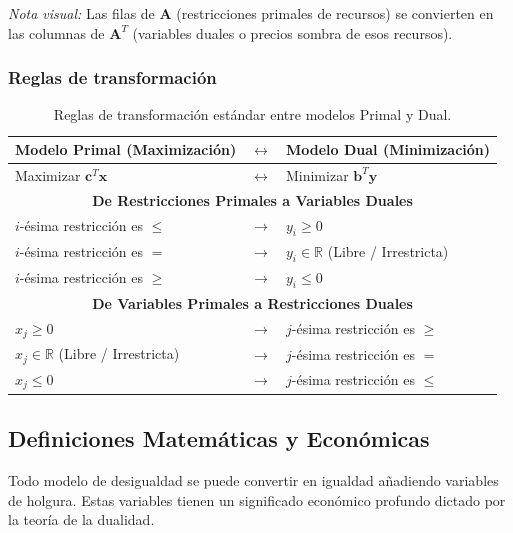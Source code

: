 \documentclass{article}
\begin{document}
	\vspace{0.5cm}
	\textit{Nota visual:} Las filas de $\mathbf{A}$ (restricciones primales de recursos) se convierten en las columnas de $\mathbf{A}^T$ (variables duales o precios sombra de esos recursos).
	
	\subsubsection{Reglas de transformación}
	\begin{table}[h]
		\centering
		\renewcommand{\arraystretch}{1.3}
		\begin{tabular}{|l|c|l|}
			\hline
			\textbf{Modelo Primal (Maximización)} & $\leftrightarrow$ & \textbf{Modelo Dual (Minimización)} \\ \hline
			Maximizar $\mathbf{c}^T \mathbf{x}$ & $\leftrightarrow$ & Minimizar $\mathbf{b}^T \mathbf{y}$ \\ \hline
			\multicolumn{3}{|c|}{\textbf{De Restricciones Primales a Variables Duales}} \\ \hline
			$i$-ésima restricción es $\leq$ & $\rightarrow$ & $y_i \geq 0$ \\ \hline
			$i$-ésima restricción es $=$ & $\rightarrow$ & $y_i \in \mathbb{R}$ (Libre / Irrestricta) \\ \hline
			$i$-ésima restricción es $\geq$ & $\rightarrow$ & $y_i \leq 0$ \\ \hline
			\multicolumn{3}{|c|}{\textbf{De Variables Primales a Restricciones Duales}} \\ \hline
			$x_j \geq 0$ & $\rightarrow$ & $j$-ésima restricción es $\geq$ \\ \hline
			$x_j \in \mathbb{R}$ (Libre / Irrestricta) & $\rightarrow$ & $j$-ésima restricción es $=$ \\ \hline
			$x_j \leq 0$ & $\rightarrow$ & $j$-ésima restricción es $\leq$ \\ \hline
		\end{tabular}
		\caption{Reglas de transformación estándar entre modelos Primal y Dual.}
		\label{tab:primal_dual}
	\end{table}
	
	\newpage
	
	\subsection{Definiciones Matemáticas y Económicas}
	Todo modelo de desigualdad se puede convertir en igualdad añadiendo variables de holgura. Estas variables tienen un significado económico profundo dictado por la teoría de la dualidad.
	
\end{document}
